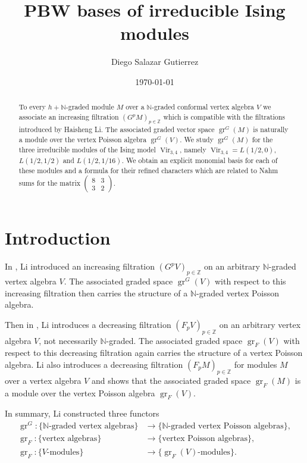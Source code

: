 \documentclass[a4paper, 12pt, reqno]{amsart}
\theoremstyle{remark}
\DeclareMathOperator{\Vir}{Vir}
\DeclareMathOperator{\gr}{gr}
\begin{document}
\begin{abstract}
  To every $h + \mathbb{N}$-graded module $M$ over a $\mathbb{N}$-graded conformal vertex algebra $V$ we associate an increasing filtration $(G^pM)_{p \in \mathbb{Z}}$ which is compatible with the filtrations introduced by Haisheng Li.
  The associated graded vector space $\gr^G(M)$ is naturally a module over the vertex Poisson algebra $\gr^G(V)$.
  We study $\gr^G(M)$ for the three irreducible modules of the Ising model $\Vir_{3, 4}$, namely $\Vir_{3,4} = L(1/2, 0)$, $L(1/2, 1/2)$ and $L(1/2, 1/16)$.
  We obtain an explicit monomial basis for each of these modules and a formula for their refined characters which are related to Nahm sums for the matrix $\left(\begin{smallmatrix} 8 & 3 \\ 3 & 2 \end{smallmatrix}\right)$.
\end{abstract}

\title{PBW bases of irreducible Ising modules}
\author{Diego Salazar Gutierrez}
\address{Instituto de Matemática Pura e Aplicada, Rio de Janeiro, RJ, Brazil}
\date{\today}
\maketitle

\section{Introduction}
\label{sec:introduction}

In \cite{li_vertex_2004}, Li introduced an increasing filtration $(G^pV)_{p \in \mathbb{Z}}$ on an arbitrary $\mathbb{N}$-graded vertex algebra $V$.
The associated graded space $\gr^G(V)$ with respect to this increasing filtration then carries the structure of a $\mathbb{N}$-graded vertex Poisson algebra.

Then in \cite{li_abelianizing_2005}, Li introduces a decreasing filtration $(F_pV)_{p \in \mathbb{Z}}$ on an arbitrary vertex algebra $V$, not necessarily $\mathbb{N}$-graded.
The associated graded space $\gr_F(V)$ with respect to this decreasing filtration again carries the structure of a vertex Poisson algebra.
Li also introduces a decreasing filtration $(F_pM)_{p \in \mathbb{Z}}$ for modules $M$ over a vertex algebra $V$ and shows that the associated graded space $\gr_F(M)$ is a module over the vertex Poisson algebra $\gr_F(V)$.

In summary, Li constructed three functors
\begin{align*}
  \gr^G: \{\text{$\mathbb{N}$-graded vertex algebras}\} &\to \{\text{$\mathbb{N}$-graded vertex Poisson algebras}\}, \\
  \gr_F: \{\text{vertex algebras}\} &\to \{\text{vertex Poisson algebras}\}, \\
  \gr_F: \{\text{$V$-modules}\} &\to \{\text{$\gr_F(V)$-modules}\}.
\end{align*}
\end{document}
